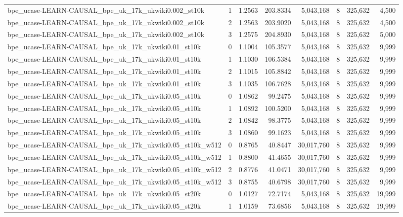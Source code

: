\begin{tabular}{lrrrrrrr}
bpe\_ucase-LEARN-CAUSAL\_bpe\_uk\_17k\_ukwiki0.002\_st10k & 1 & 1.2563 & 203.8334 & 5,043,168 & 8 & 325,632 & 4,500 \\
bpe\_ucase-LEARN-CAUSAL\_bpe\_uk\_17k\_ukwiki0.002\_st10k & 2 & 1.2563 & 203.9020 & 5,043,168 & 8 & 325,632 & 4,500 \\
bpe\_ucase-LEARN-CAUSAL\_bpe\_uk\_17k\_ukwiki0.002\_st10k & 3 & 1.2575 & 204.8930 & 5,043,168 & 8 & 325,632 & 5,000 \\
bpe\_ucase-LEARN-CAUSAL\_bpe\_uk\_17k\_ukwiki0.01\_st10k & 0 & 1.1004 & 105.3577 & 5,043,168 & 8 & 325,632 & 9,999 \\
bpe\_ucase-LEARN-CAUSAL\_bpe\_uk\_17k\_ukwiki0.01\_st10k & 1 & 1.1030 & 106.5384 & 5,043,168 & 8 & 325,632 & 9,999 \\
bpe\_ucase-LEARN-CAUSAL\_bpe\_uk\_17k\_ukwiki0.01\_st10k & 2 & 1.1015 & 105.8842 & 5,043,168 & 8 & 325,632 & 9,999 \\
bpe\_ucase-LEARN-CAUSAL\_bpe\_uk\_17k\_ukwiki0.01\_st10k & 3 & 1.1035 & 106.7628 & 5,043,168 & 8 & 325,632 & 9,999 \\
bpe\_ucase-LEARN-CAUSAL\_bpe\_uk\_17k\_ukwiki0.05\_st10k & 0 & 1.0862 & 99.2475 & 5,043,168 & 8 & 325,632 & 9,999 \\
bpe\_ucase-LEARN-CAUSAL\_bpe\_uk\_17k\_ukwiki0.05\_st10k & 1 & 1.0892 & 100.5200 & 5,043,168 & 8 & 325,632 & 9,999 \\
bpe\_ucase-LEARN-CAUSAL\_bpe\_uk\_17k\_ukwiki0.05\_st10k & 2 & 1.0842 & 98.3775 & 5,043,168 & 8 & 325,632 & 9,999 \\
bpe\_ucase-LEARN-CAUSAL\_bpe\_uk\_17k\_ukwiki0.05\_st10k & 3 & 1.0860 & 99.1623 & 5,043,168 & 8 & 325,632 & 9,999 \\
bpe\_ucase-LEARN-CAUSAL\_bpe\_uk\_17k\_ukwiki0.05\_st10k\_w512 & 0 & 0.8765 & 40.8447 & 30,017,760 & 8 & 325,632 & 9,999 \\
bpe\_ucase-LEARN-CAUSAL\_bpe\_uk\_17k\_ukwiki0.05\_st10k\_w512 & 1 & 0.8800 & 41.4655 & 30,017,760 & 8 & 325,632 & 9,999 \\
bpe\_ucase-LEARN-CAUSAL\_bpe\_uk\_17k\_ukwiki0.05\_st10k\_w512 & 2 & 0.8776 & 41.0471 & 30,017,760 & 8 & 325,632 & 9,999 \\
bpe\_ucase-LEARN-CAUSAL\_bpe\_uk\_17k\_ukwiki0.05\_st10k\_w512 & 3 & 0.8755 & 40.6798 & 30,017,760 & 8 & 325,632 & 9,999 \\
bpe\_ucase-LEARN-CAUSAL\_bpe\_uk\_17k\_ukwiki0.05\_st20k & 0 & 1.0127 & 72.7174 & 5,043,168 & 8 & 325,632 & 19,999 \\
bpe\_ucase-LEARN-CAUSAL\_bpe\_uk\_17k\_ukwiki0.05\_st20k & 1 & 1.0159 & 73.6856 & 5,043,168 & 8 & 325,632 & 19,999 \\

\end{tabular}
